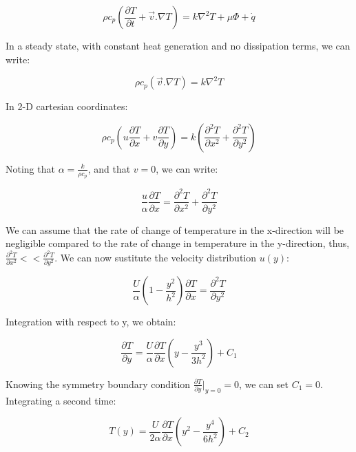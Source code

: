 \begin{equation}
\rho c_p \left( \frac{\partial T}{\partial t} + \vec{v}.\nabla T \right) = k \nabla^2 T + \mu \Phi + \dot{q}
\end{equation}

In a steady state, with constant heat generation and no dissipation terms, we can write:


\begin{equation}
\rho c_p \left( \vec{v}.\nabla T \right) = k \nabla^2 T
\end{equation}

In 2-D cartesian coordinates:

\begin{equation}
\rho c_p \left( u\frac{\partial T}{\partial x} + v\frac{\partial T}{\partial y} \right) = k \left( \frac{\partial^2 T}{\partial x^2} + \frac{\partial^2 T}{\partial y^2} \right)
\end{equation}

Noting that $\alpha = \frac{k}{\rho c_p}$, and that $v = 0$, we can write:


\begin{equation}
\frac{u}{\alpha} \frac{\partial T}{\partial x} = \frac{\partial^2 T}{\partial x^2} + \frac{\partial^2 T}{\partial y^2}
\end{equation}

We can assume that the rate of change of temperature in the x-direction will be negligible compared to the rate of change in temperature in the y-direction, thus, $\frac{\partial^2 T}{\partial x^2} << \frac{\partial^2 T}{\partial y^2}$. We can now sustitute the velocity distribution $u(y)$:


\begin{equation}
\frac{U}{\alpha} \left( 1 - \frac{y^2}{h^2} \right) \frac{\partial T}{\partial x} = \frac{\partial^2 T}{\partial y^2}
\end{equation}

Integration with respect to y, we obtain:

\begin{equation}
\frac{\partial T}{\partial y} = \frac{U}{\alpha} \frac{\partial T}{\partial x} \left( y - \frac{y^3}{3h^2} \right) + C_1
\end{equation}

Knowing the symmetry boundary condition $\frac{\partial T}{\partial y}\bigg\rvert_{y = 0} = 0$, we can set $C_1 = 0$. Integrating a second time:


\begin{equation}
T(y) = \frac{U}{2\alpha} \frac{\partial T}{\partial x} \left( y^2 - \frac{y^4}{6h^2} \right) + C_2
\end{equation}

